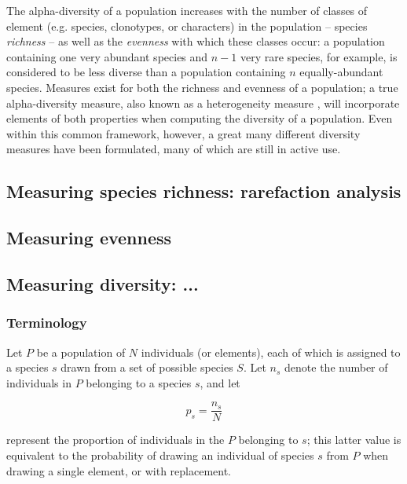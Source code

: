 The alpha-diversity of a population increases with the number of classes of element (e.g. species, clonotypes, or characters) in the population -- species \textit{richness} -- as well as the \textit{evenness} with which these classes occur: a population containing one very abundant species and $n-1$ very rare species, for example, is considered to be less diverse than a population containing $n$ equally-abundant species. %
Measures exist for both the richness and evenness of a population; a true alpha-diversity measure, also known as a heterogeneity measure \citep{peet1974diversity}, will incorporate elements of both properties when computing the diversity of a population. Even within this common framework, however, a great many different diversity measures have been formulated, many of which are still in active use. 

\subsection{Measuring species richness: rarefaction analysis}

\subsection{Measuring evenness}

\subsection{Measuring diversity: ...}

\subsubsection{Terminology}

Let $P$ be a population of $N$ individuals (or elements), each of which is assigned to a species $s$ drawn from a set of possible species $S$. Let $n_s$ denote the number of individuals in $P$ belonging to a species $s$, and let 

\begin{equation}
p_s = \frac{n_s}{N}
\label{eq:species_proportion}
\end{equation}

represent the proportion of individuals in the $P$ belonging to $s$; this latter value is equivalent to the probability of drawing an individual of species $s$ from $P$ when drawing a single element, or with replacement. 

